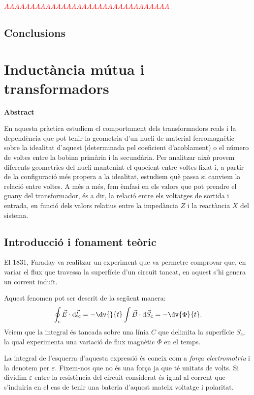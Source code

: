 \documentclass[a4paper,10.5pt]{report}
\newenvironment{chapterabstract}{
	\begin{center}
		\bfseries Abstract
	\end{center}
	\quotation
}{\endquotation}
\begin{document}
\textcolor{red}{$AAAAAAAAAAAAAAAAAAAAAAAAAAAAAAAA$}

\section{Conclusions}


\chapter{Inductància mútua i transformadors}

\begin{chapterabstract}
	En aquesta pràctica estudiem el comportament dels transformadors reals i la dependència que pot tenir la geometria d'un nucli de material ferromagnètic sobre la idealitat d'aquest (determinada pel coeficient d'acoblament) o el número de voltes entre la bobina primària i la secundària. Per analitzar això provem diferents geometries del nucli mantenint el quocient entre voltes fixat i, a partir de la configuració més propera a la idealitat, estudiem què passa si canviem la relació entre voltes. A més a més, fem èmfasi en els valors que pot prendre el guany del transformador, és a dir, la relació entre els voltatges de sortida i entrada, en funció dels valors relatius entre la impedància $Z$ i la reactància $X$ del sistema.
\end{chapterabstract}

\section{Introducció i fonament teòric}
El 1831, Faraday va realitzar un experiment que va permetre comprovar que, en variar el flux que travessa la superfície d'un circuit tancat, en aquest s'hi genera un corrent induït.

Aquest fenomen pot ser descrit de la següent manera:
\begin{equation}
	\oint_c \Vec{E}\cdot \mathrm{d}\Vec{l}_c = -\dv{}{t} \int \Vec{B}\cdot \mathrm{d} \Vec{S}_c = - \dv{\Phi}{t} \label{eq:4:1}.
\end{equation}
Veiem que la integral és tancada sobre una línia $C$ que delimita la superfície $S_c$, la qual experimenta una variació de flux magnètic $\Phi$ en el temps.

La integral de l'esquerra d'aquesta expressió és coneix com a \textit{força electromotriu} i la denotem per $\varepsilon$. Fixem-nos que no és una força ja que té unitats de volts. Si dividim $\varepsilon$ entre la resistència del circuit considerat és igual al corrent que s'induiria en el cas de tenir una bateria d'aquest mateix voltatge i polaritat.
\end{document}
